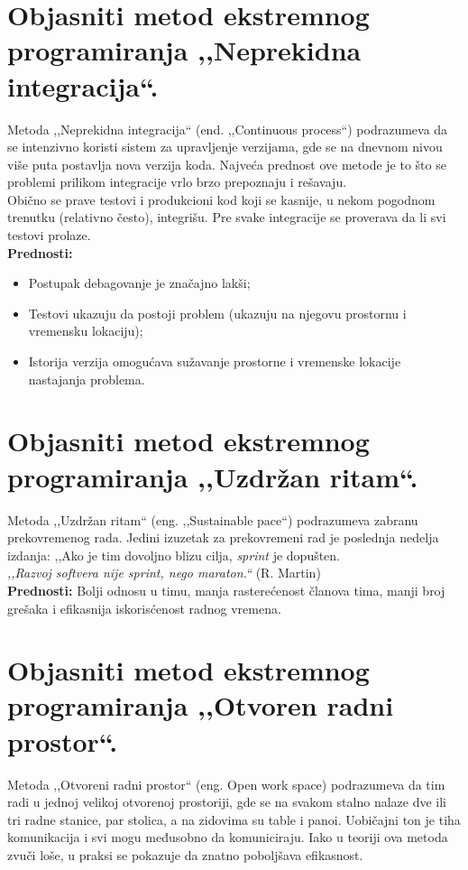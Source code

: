 \documentclass[a4paper]{article}
\begin{document}
\section{Objasniti metod ekstremnog programiranja ,,Neprekidna integracija``.}
  Metoda ,,Neprekidna integracija`` (end. ,,Continuous process``) podrazumeva da se intenzivno 
  koristi sistem za upravljenje verzijama, gde se na dnevnom nivou više puta postavlja nova
  verzija koda. Najveća prednost ove metode je to što se problemi prilikom integracije vrlo 
  brzo prepoznaju i rešavaju. \\
  \indent Obično se prave testovi i produkcioni kod koji se kasnije, u nekom pogodnom trenutku (relativno 
  često), integrišu. Pre svake integracije se proverava da li svi testovi prolaze. \\
  \textbf{Prednosti:}
  \begin{itemize}
    \item Postupak debagovanje je značajno lakši;
    \item Testovi ukazuju da postoji problem (ukazuju na njegovu prostornu i vremensku lokaciju);
    \item Istorija verzija omogućava sužavanje prostorne i vremenske lokacije nastajanja problema.
  \end{itemize}

\section{Objasniti metod ekstremnog programiranja ,,Uzdržan ritam``.}
  Metoda ,,Uzdržan ritam`` (eng. ,,Sustainable pace``) podrazumeva zabranu prekovremenog rada.
  Jedini izuzetak za prekovremeni rad je poslednja nedelja izdanja: ,,Ako je tim dovoljno blizu
  cilja, \textit{sprint} je dopušten. \\

  \textit{,,Razvoj softvera nije sprint, nego maraton.``}  (R. Martin)\\

  \textbf{Prednosti:} Bolji odnosu u timu, manja rasterećenost članova tima, manji broj grešaka i
  efikasnija iskorisćenost radnog vremena.

\section{Objasniti metod ekstremnog programiranja ,,Otvoren radni prostor``.}
  Metoda ,,Otvoreni radni prostor`` (eng. Open work space) podrazumeva da tim radi u jednoj
  velikoj otvorenoj prostoriji, gde se na svakom stalno nalaze dve ili tri radne stanice, 
  par stolica, a na zidovima su table i panoi. Uobičajni ton je tiha komunikacija i svi mogu
  međusobno da komuniciraju. Iako u teoriji ova metoda zvuči loše, u praksi se pokazuje da znatno 
  poboljšava efikasnost.
\end{document}
